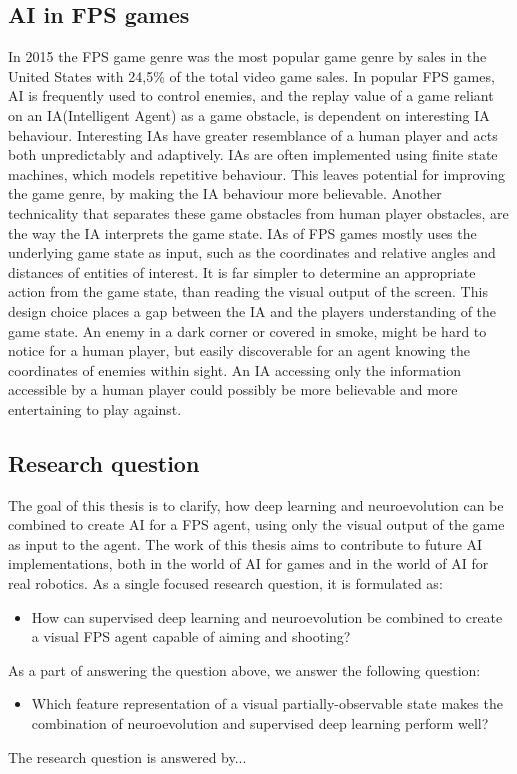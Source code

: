 \subsection{AI in FPS games}
In 2015 the FPS game genre was the most popular game genre by sales in the United States\cite{marketshare} with 24,5\% of the total video game sales. In popular FPS games, AI is frequently used to control enemies, and the replay value of a game reliant on an IA(Intelligent Agent) as a game obstacle, is dependent on interesting IA behaviour. Interesting IAs have greater resemblance of a human player and acts both unpredictably and adaptively. IAs are often implemented using finite state machines, which models repetitive behaviour. This leaves potential for improving the game genre, by making the IA behaviour more believable. Another technicality that separates these game obstacles from human player obstacles, are the way the IA interprets the game state. IAs of FPS games mostly uses the underlying game state as input, such as the coordinates and relative angles and distances of entities of interest. It is far simpler to determine an appropriate action from the game state, than reading the visual output of the screen. This design choice places a gap between the IA and the players understanding of the game state. An enemy in a dark corner or covered in smoke, might be hard to notice for a human player, but easily discoverable for an agent knowing the coordinates of enemies within sight. An IA accessing only the information accessible by a human player could possibly be more believable and more entertaining to play against. 

\subsection{Research question}
\label{sub:research-question}
The goal of this thesis is to clarify, how deep learning and neuroevolution can be combined to create AI for a FPS agent, using only the visual output of the game as input to the agent. The work of this thesis aims to contribute to future AI implementations, both in the world of AI for games and in the world of AI for real robotics. As a single focused research question, it is formulated as:
\begin{itemize}
\item How can supervised deep learning and neuroevolution be combined to create a visual FPS agent capable of aiming and shooting?
\end{itemize}
{\setlength{\parindent}{0cm}
As a part of answering the question above, we answer the following question:
}
\begin{itemize}
\item Which feature representation of a visual partially-observable state makes the combination of neuroevolution and supervised deep learning perform well?
\end{itemize}
The research question is answered by...

